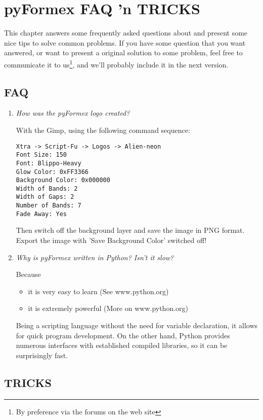 
\chapter{pyFormex FAQ 'n TRICKS}
\label{cha:faq}

This chapter answers some frequently asked questions about \pyformex and present some nice tips to solve common problems. If you have some question that you want answered, or want to present a original solution to some problem, feel free to communicate it to us\footnote{By preference via the forums on the \pyformex web site}, and we'll probably include it in the next version.  

\section{FAQ}
\label{Sec:faq}
\begin{enumerate}
\item \emph{How was the pyFormex logo created?}

With the Gimp, using the following command sequence: 
\begin{verbatim}
Xtra -> Script-Fu -> Logos -> Alien-neon
Font Size: 150 
Font: Blippo-Heavy
Glow Color: 0xFF3366
Background Color: 0x000000
Width of Bands: 2
Width of Gaps: 2
Number of Bands: 7
Fade Away: Yes
\end{verbatim}
Then switch off the background layer and save the image in PNG format.
Export the image with 'Save Background Color' switched off!



\item \emph{Why is pyFormex written in Python? Isn't it slow?}

Because
\begin{itemize}
\item it is very easy to learn (See www.python.org)
\item it is extremely powerful (More on www.python.org)
\end{itemize}

Being a scripting language without the need for variable declaration, it allows for quick program development.
On the other hand, Python provides numerous interfaces with established compiled libraries, so it can be surprisingly fast.


\end{enumerate}


\section{TRICKS}
\label{sec:tricks}

